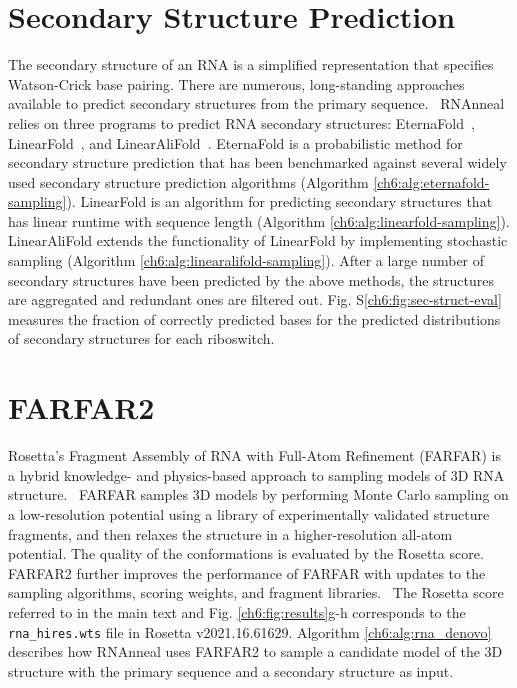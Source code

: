
\section{Secondary Structure Prediction}
{}
\label{ch6:methods:sec-struct}
The secondary structure of an RNA is a simplified representation that specifies Watson-Crick base pairing. There are numerous, long-standing approaches available to predict secondary structures from the primary sequence.~\cite{sato2023recent} RNAnneal relies on three programs to predict RNA secondary structures: EternaFold~\cite{wayment2022rna}, LinearFold~\cite{huang2019linearfold}, and LinearAliFold~\cite{huang2019linearfold}. EternaFold is a probabilistic method for secondary structure prediction that
has been benchmarked against several widely used secondary structure prediction algorithms (Algorithm \ref{ch6:alg:eternafold-sampling}). LinearFold is an algorithm for predicting secondary structures that has linear runtime with sequence length (Algorithm \ref{ch6:alg:linearfold-sampling}). LinearAliFold extends the functionality of LinearFold by implementing stochastic sampling (Algorithm \ref{ch6:alg:linearalifold-sampling}). After a large number of secondary structures have been predicted by the above methods, the structures are aggregated and redundant ones are filtered out.  Fig. S\ref{ch6:fig:sec-struct-eval} measures the fraction of correctly predicted bases for the predicted distributions of secondary structures for each riboswitch.

\section{FARFAR2}
{}
\label{ch6:methods:tertiary-struct}

Rosetta's Fragment Assembly of RNA with Full-Atom Refinement (FARFAR) is a hybrid knowledge- and physics-based approach to sampling models of 3D RNA structure.~\cite{das2010atomic} FARFAR samples 3D models by performing Monte Carlo sampling on a low-resolution potential using a library of experimentally validated structure fragments, and then relaxes the structure in a higher-resolution all-atom potential. The quality of the conformations is evaluated by the Rosetta score. FARFAR2 further improves the performance of FARFAR with updates to the sampling algorithms, scoring weights, and fragment libraries.~\cite{watkins2020farfar2} The Rosetta score referred to in the main text and Fig. \ref{ch6:fig:results}g-h corresponds to the \texttt{rna\_hires.wts} file in Rosetta v2021.16.61629. Algorithm \ref{ch6:alg:rna_denovo} describes how RNAnneal uses FARFAR2 to sample a candidate model of the 3D structure with the primary sequence and a secondary structure as input.

